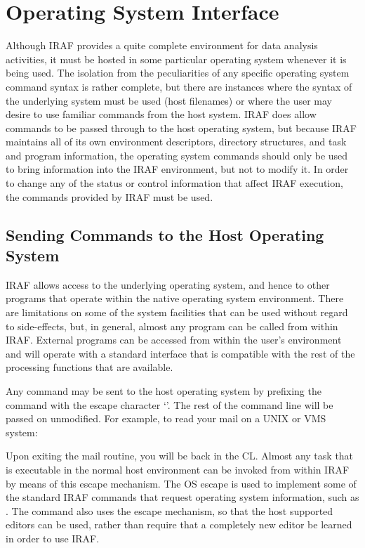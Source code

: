 \newpage
\section{Operating System Interface}

\ppind
Although IRAF provides a quite complete environment for data analysis
activities, it must be hosted in some particular operating system whenever
it is being used.  The isolation from the peculiarities of any
specific operating system command syntax is rather complete, but there
are instances where the syntax of the underlying system must be
used (host filenames) or where the user may desire to use familiar
commands from the host system.  IRAF does allow commands to be passed
through to the host operating system, but because IRAF maintains all of
its own environment descriptors, directory structures, and task and
program information, the operating system commands should only be used
to bring information into the IRAF environment, but not to modify it.
In order to change any of the status or control information that
affect IRAF execution, the commands provided by IRAF must be used.

\subsection{Sending Commands to the Host Operating System}

\ppind
IRAF allows access to the underlying operating system, and hence to
other programs that operate within the native operating system
environment.  There are limitations on some of the system facilities that
can be used without regard to side-effects, but, in general, almost any
program can be called from within IRAF.
External programs can be accessed from within the user's environment and will 
operate with a standard interface that is compatible with the
rest of the processing functions that are available.

Any command may be sent to the host operating system by prefixing
the command with the escape character `\usertype{!}'.  The rest of the
command line will be passed on unmodified.  For example, to read your mail
on a UNIX or VMS system:

\begin{quotation}\noindent
{} 
\end{quotation}

\noindent
Upon exiting the mail routine, you will be back in the CL. Almost any
task that is executable in the normal host environment can be invoked
from within IRAF by means of this escape mechanism.  The OS escape
is used to implement some of the standard IRAF commands that request
operating system information, such as .
The  command also uses the escape mechanism, so that
the host supported editors can be used, rather than require that a
completely new editor be learned in order to use IRAF.

